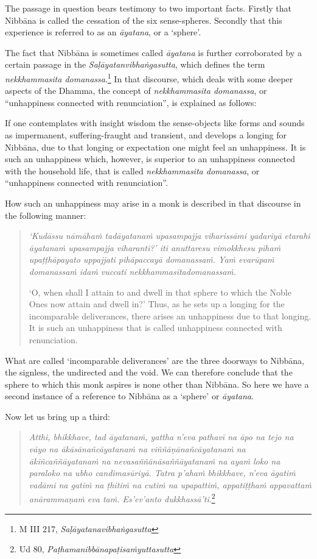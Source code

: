 The passage in question bears testimony to two important facts. Firstly that Nibbāna is called the cessation of the six sense-spheres. Secondly that this experience is referred to as an \emph{āyatana}, or a `sphere'.

The fact that Nibbāna is sometimes called \emph{āyatana} is further corroborated by a certain passage in the \emph{Saḷāyatanvibhaṅgasutta}, which defines the term \emph{nekkhammasita domanassa}.\footnote{M III 217, \emph{Saḷāyatanavibhaṅgasutta}} In that discourse, which deals with some deeper aspects of the Dhamma, the concept of \emph{nekkhammasita domanassa}, or ``unhappiness connected with renunciation'', is explained as follows:

If one contemplates with insight wisdom the sense-objects like forms and sounds as impermanent, suffering-fraught and transient, and develops a longing for Nibbāna, due to that longing or expectation one might feel an unhappiness. It is such an unhappiness which, however, is superior to an unhappiness connected with the household life, that is called \emph{nekkhammasita domanassa}, or ``unhappiness connected with renunciation''.

How such an unhappiness may arise in a monk is described in that discourse in the following manner:

\begin{quote}
\emph{`Kudāssu nāmāhaṁ tadāyatanaṁ upasampajja viharissāmi yadariyā etarahi āyatanaṁ upasampajja viharanti?' iti anuttaresu vimokkhesu pihaṁ upaṭṭhāpayato uppajjati pihāpaccayā domanassaṁ. Yaṁ evarūpaṁ domanassaṁ idaṁ vuccati nekkhammasitadomanassaṁ.}

`O, when shall I attain to and dwell in that sphere to which the Noble Ones now attain and dwell in?' Thus, as he sets up a longing for the incomparable deliverances, there arises an unhappiness due to that longing. It is such an unhappiness that is called unhappiness connected with renunciation.
\end{quote}

What are called `incomparable deliverances' are the three doorways to Nibbāna, the signless, the undirected and the void. We can therefore conclude that the sphere to which this monk aspires is none other than Nibbāna. So here we have a second instance of a reference to Nibbāna as a `sphere' or \emph{āyatana}.

Now let us bring up a third:

\begin{quote}
\emph{Atthi, bhikkhave, tad āyatanaṁ, yattha n'eva pathavī na āpo na tejo na vāyo na ākāsānañcāyatanaṁ na viññāṇānañcāyatanaṁ na ākiñcaññāyatanaṁ na nevasaññānāsaññāyatanaṁ na ayaṁ loko na paraloko na ubho candimasūriyā. Tatra p'ahaṁ bhikkhave, n'eva āgatiṁ vadāmi na gatiṁ na ṭhitiṁ na cutiṁ na upapattiṁ, appatiṭṭhaṁ appavattaṁ anārammaṇaṁ eva taṁ. Es'ev'anto dukkhassā'ti}.\footnote{Ud 80, \emph{Paṭhamanibbānapaṭisaṁyuttasutta}}
\end{quote}

